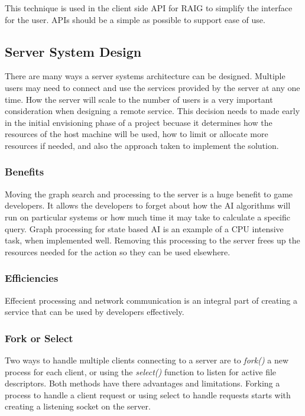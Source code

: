 \documentclass[12pt,a4paper,titlepage]{article}
\begin{document}
This technique is used in the client side API for RAIG to simplify the interface for the user. APIs should be a simple as possible to support ease of use. 

\subsection{Server System Design}

There are many ways a server systems architecture can be designed. Multiple users may need to connect and use the services provided by the server at any one time. How the server will scale to the number of users is a very important consideration when designing a remote service. This decision needs to made early in the initial envisioning phase of a project becuase it determines how the resources of the host machine will be used, how to limit or allocate more resources if needed, and also the approach taken to implement the solution.\\

\subsubsection{Benefits}

Moving the graph search and processing to the server is a huge benefit to game developers. It allows the developers to forget about how the AI algorithms will run on particular systems or how much time it may take to calculate a specific query. Graph processing for state based AI is an example of a CPU intensive task, when implemented well. Removing this processing to the server frees up the resources needed for the action so they can be used elsewhere.\\

\subsubsection{Efficiencies}

Effecient processing and network communication is an integral part of creating a service that can be used by developers effectively. 

\subsubsection{Fork or Select}

Two ways to handle multiple clients connecting to a server are to \textit{fork()} a new process for each client, or using the \textit{select()} function to listen for active file descriptors. Both methods have there advantages and limitations. Forking a process to handle a client request or using select to handle requests starts with creating a listening socket on the server. 
\end{document}
